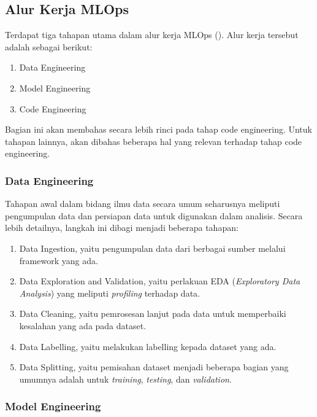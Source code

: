 \subsection{Alur Kerja MLOps}

Terdapat tiga tahapan utama dalam alur kerja MLOps (\cite{mlopsorg}).
Alur kerja tersebut adalah sebagai berikut:
\begin{enumerate}
  \item Data Engineering
  \item Model Engineering
  \item Code Engineering
\end{enumerate}

Bagian ini akan membahas secara lebih rinci pada tahap code engineering.
Untuk tahapan lainnya, akan dibahas beberapa hal yang relevan terhadap tahap code engineering.

\subsubsection{Data Engineering}

Tahapan awal dalam bidang ilmu data secara umum seharusnya meliputi pengumpulan data dan persiapan data untuk digunakan dalam analisis.
Secara lebih detailnya, langkah ini dibagi menjadi beberapa tahapan:
\begin{enumerate}
  \item Data Ingestion, yaitu pengumpulan data dari berbagai sumber melalui framework yang ada. 
  \item Data Exploration and Validation, yaitu perlakuan EDA (\textit{Exploratory Data Analysis}) yang meliputi \textit{profiling} terhadap data.
  \item Data Cleaning, yaitu pemrosesan lanjut pada data untuk memperbaiki kesalahan yang ada pada dataset.
  \item Data Labelling, yaitu melakukan labelling kepada dataset yang ada.
  \item Data Splitting, yaitu pemisahan dataset menjadi beberapa bagian yang umumnya adalah untuk \textit{training}, \textit{testing}, dan \textit{validation}.
\end{enumerate}

\subsubsection{Model Engineering}

